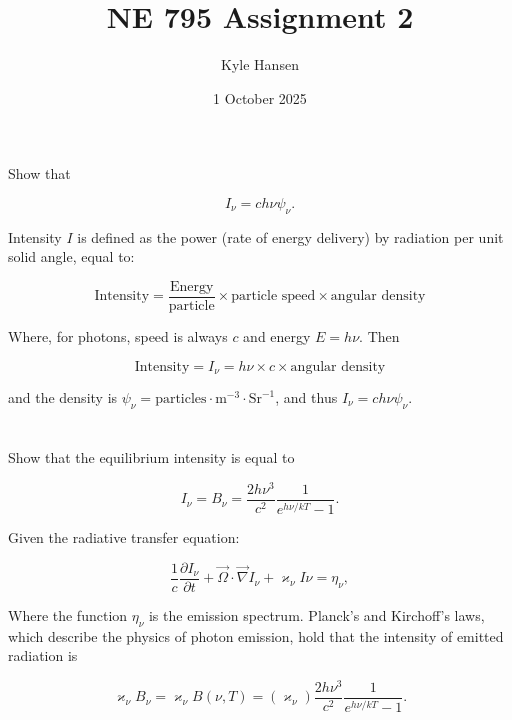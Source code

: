 \documentclass{template}
\title{NE 795 Assignment 2}
\author{Kyle Hansen}
\date{1 October 2025}
\begin{document}
\maketitle

\section{} Show that 

\[
    I_\nu = ch\nu\psi_\nu.
\]

Intensity $I$ is defined as the power (rate of energy delivery) by radiation per unit solid angle, equal to:

\begin{equation}
        \text{Intensity} = \frac{\text{Energy}}{\text{particle}}\times\text{particle speed}\times\text{angular density}
\end{equation}

Where, for photons, speed is always $c$ and energy $E=h\nu$. Then

\begin{equation}
        \text{Intensity} = I_\nu = h\nu \times c\times\text{angular density}
\end{equation}

and the density is $\psi_\nu = \text{particles}\cdot\text{m}^{-3}\cdot \text{Sr}^{-1}$, and thus $I_\nu = ch\nu\psi_\nu$.



\section{}

Show that the equilibrium intensity is equal to

\[
I_\nu = B_\nu = \frac{2h\nu^3}{c^2}\frac{1}{e^{h\nu/kT}-1}.
\]

Given the radiative transfer equation:

\begin{equation}
    \frac{1}{c}\frac{\partial I_\nu}{\partial t} + \vec{\Omega}\cdot\vec{\nabla}I_\nu + \varkappa_\nu I\nu = \eta_\nu,
\end{equation}

Where the function $\eta_\nu$ is the emission spectrum. Planck's and Kirchoff's laws, which describe the physics of photon emission, hold that the intensity of emitted radiation is

\begin{equation}
    \varkappa_\nu B_\nu = \varkappa_\nu B(\nu, T) = (\varkappa_\nu) \frac{2h\nu^3}{c^2}\frac{1}{e^{h\nu/kT}-1}.
\end{equation}
\end{document}
